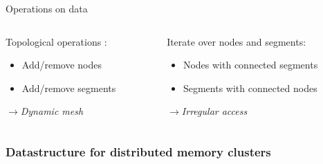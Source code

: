 \documentclass[aspectratio=1610,t,10pt]{beamer}
\begin{document}
\begin{frame}
\begin{columns}[c]
\begin{column}{.48\textwidth}
	    \end{column}
    \end{columns}
	\begin{block}{Operations on data}
		\begin{columns}[t]
			\begin{column}{0.45\columnwidth}
				Topological operations :
				\begin{itemize}
					\item Add/remove nodes
					\item Add/remove segments
				\end{itemize}
				$\rightarrow$\textit{Dynamic mesh}
			\end{column}
			\begin{column}{0.45\columnwidth}
				Iterate over nodes and segments:
				\begin{itemize}
					\item Nodes with connected segments
					\item Segments with connected nodes
				\end{itemize}
				$\rightarrow$\textit{Irregular access}
			\end{column}
		\end{columns}
	\end{block}
\end{frame}

\subsubsection{Datastructure for distributed memory clusters}
\end{document}
